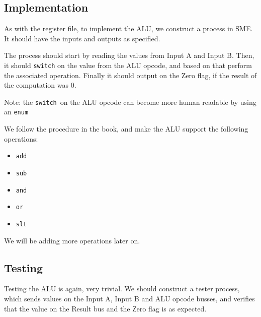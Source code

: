 \documentclass{beamer}
\begin{document}
\subsection{Implementation}
\begin{frame}
    As with the register file, to implement the ALU, we construct a process in
    SME. It should have the inputs and outputs as specified.

    \vspace{\baselineskip}
    The process should start by reading the values from Input A and Input B.
    Then, it should \texttt{switch} on the value from the ALU opcode, and based
    on that perform the associated operation. Finally it should output on the
    Zero flag, if the result of the computation was 0.

    \vspace{\baselineskip}
    Note: the \texttt{switch} on the ALU opcode can become more human readable
    by using an \texttt{enum}
\end{frame}
\begin{frame}
    We follow the procedure in the book, and make the ALU support the following
    operations:
    \begin{itemize}
        \item \texttt{add}
        \item \texttt{sub}
        \item \texttt{and}
        \item \texttt{or}
        \item \texttt{slt}
    \end{itemize}
    We will be adding more operations later on.
\end{frame}
\subsection{Testing}
\begin{frame}
    Testing the ALU is again, very trivial. We should construct a tester
    process, which sends values on the Input A, Input B and ALU opcode busses,
    and verifies that the value on the Result bus and the Zero flag is as
    expected.
\end{frame}
\end{document}
